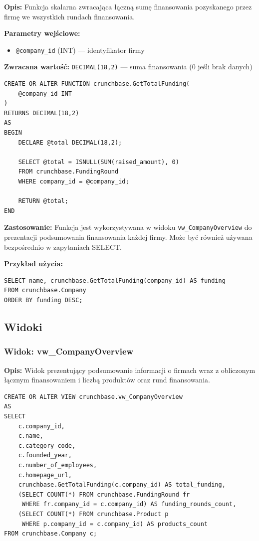 \documentclass[12pt,a4paper]{article}
\begin{document}
\textbf{Opis:} Funkcja skalarna zwracająca łączną sumę finansowania pozyskanego przez firmę we wszystkich rundach finansowania.

\textbf{Parametry wejściowe:}
\begin{itemize}[noitemsep]
    \item \texttt{@company\_id} (INT) --- identyfikator firmy
\end{itemize}

\textbf{Zwracana wartość:} \texttt{DECIMAL(18,2)} --- suma finansowania (0 jeśli brak danych)

\begin{lstlisting}[caption={Funkcja GetTotalFunding}]
CREATE OR ALTER FUNCTION crunchbase.GetTotalFunding(
    @company_id INT
)
RETURNS DECIMAL(18,2)
AS
BEGIN
    DECLARE @total DECIMAL(18,2);

    SELECT @total = ISNULL(SUM(raised_amount), 0)
    FROM crunchbase.FundingRound
    WHERE company_id = @company_id;

    RETURN @total;
END
\end{lstlisting}

\textbf{Zastosowanie:} Funkcja jest wykorzystywana w widoku \texttt{vw\_CompanyOverview} do prezentacji podsumowania finansowania każdej firmy. Może być również używana bezpośrednio w zapytaniach SELECT.

\textbf{Przykład użycia:}
\begin{lstlisting}
SELECT name, crunchbase.GetTotalFunding(company_id) AS funding
FROM crunchbase.Company
ORDER BY funding DESC;
\end{lstlisting}

\subsection{Widoki}

\subsubsection{Widok: vw\_CompanyOverview}

\textbf{Opis:} Widok prezentujący podsumowanie informacji o firmach wraz z obliczonym łącznym finansowaniem i liczbą produktów oraz rund finansowania.

\begin{lstlisting}[caption={Widok vw\_CompanyOverview}]
CREATE OR ALTER VIEW crunchbase.vw_CompanyOverview
AS
SELECT
    c.company_id,
    c.name,
    c.category_code,
    c.founded_year,
    c.number_of_employees,
    c.homepage_url,
    crunchbase.GetTotalFunding(c.company_id) AS total_funding,
    (SELECT COUNT(*) FROM crunchbase.FundingRound fr
     WHERE fr.company_id = c.company_id) AS funding_rounds_count,
    (SELECT COUNT(*) FROM crunchbase.Product p
     WHERE p.company_id = c.company_id) AS products_count
FROM crunchbase.Company c;
\end{lstlisting}
\end{document}
